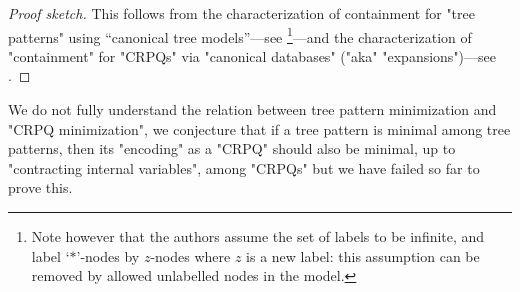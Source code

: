 \begin{proof}[Proof sketch]
	This follows from the characterization of containment for "tree patterns"
	using ``canonical tree models''---see \cite[\S4.2]{min-tree-patterns}\footnote{Note
	however that the authors assume the set of labels to be infinite, and label `$*$'-nodes
	by $z$-nodes where $z$ is a new label: this assumption can be removed by
	allowed unlabelled nodes in the model.}---and the characterization of "containment" for "CRPQs"
	via "canonical databases" ("aka" "expansions")---see .
\end{proof}

We do not fully understand the relation between tree pattern minimization and "CRPQ minimization", 
we conjecture that if a tree pattern is minimal among tree patterns, then its "encoding" as a 
"CRPQ" should also be minimal, up to "contracting internal variables", among "CRPQs" but we have failed so far to prove this. 